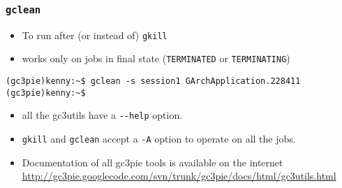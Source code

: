 \documentclass[english,serif,mathserif,xcolor=pdftex,dvipsnames,table]{beamer}
\begin{document}
\begin{frame}[fragile]
  \frametitle{\texttt{gclean}}
  \begin{itemize}
  \item To run after (or instead of) \lstinline|gkill|
  \item works only on jobs in final state (\lstinline|TERMINATED| or
    \lstinline|TERMINATING|)
  \end{itemize}

\begin{lstlisting}[basicstyle=\tt\scriptsize]
(gc3pie)kenny:~$ gclean -s session1 GArchApplication.228411
(gc3pie)kenny:~$ 
\end{lstlisting}%
\end{frame}

\begin{frame}[fragile]
  \begin{itemize}
  \item all the gc3utils have a \lstinline|--help| option.
  \item \lstinline|gkill| and \lstinline|gclean| accept a
    \lstinline|-A| option to operate on all the jobs.
  \item Documentation of all gc3pie tools is available on the internet \url{http://gc3pie.googlecode.com/svn/trunk/gc3pie/docs/html/gc3utils.html}
  \end{itemize}
\end{frame}
\end{document}
